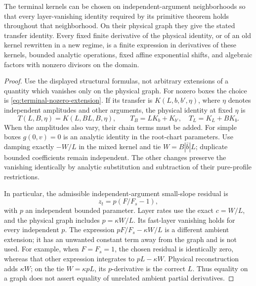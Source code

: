 \begin{lemma}
\label{lem:terminal-ambient-extension}
The terminal kernels can be chosen on independent-argument neighborhoods
so that every layer-vanishing identity required by its primitive theorem
holds throughout that neighborhood.  On their physical graph they give
the stated transfer identity.  Every fixed finite derivative of the
physical identity, or of an old kernel rewritten in a new regime, is a
finite expression in derivatives of these kernels, bounded analytic
operations, fixed affine exponential shifts, and algebraic factors with
nonzero divisors on the domain.
\end{lemma}
\begin{proof}
Use the displayed structural formulas, not arbitrary extensions of a
quantity which vanishes only on the physical graph.  For nozero boxes the
choice is \eqref{eq:terminal-nozero-extension}.  If its transfer is
\(K(L,b,b',\eta)\), where \(\eta\) denotes independent amplitudes and
other arguments, the physical identity at fixed \(\eta\) is
\[
 T(L,B,\eta)=K(L,BL,B,\eta),\qquad
 T_B=LK_b+K_{b'},\quad T_L=K_L+BK_b.
\]
When the amplitudes also vary, their chain terms must be added.
For simple boxes \(g(0,v)=0\) is an analytic identity in the root-chart
parameters.  Use damping exactly \(-W/L\) in the mixed kernel and tie
\(W=B|\bar b|L\); duplicate bounded coefficients remain independent.
The other changes preserve the vanishing identically by analytic
substitution and subtraction of their pure-profile restrictions.

In particular, the admissible independent-argument small-slope residual is
\begin{equation}\label{eq:terminal-structural-extension}
 z_t=p\left(F/F_s-1\right),
\end{equation}
with \(p\) an independent bounded parameter.  Layer rates use the exact
\(c=W/L\), and the physical graph includes \(p=\kappa W/L\).
Its fast-layer vanishing holds for every independent \(p\).
The expression \(pF/F_s-\kappa W/L\) is a different ambient extension;
it has an unwanted constant term away from the graph and is not used.
For example, when \(F=F_s=1\), the chosen residual is identically zero,
whereas that other expression integrates to \(pL-\kappa W\).
Physical reconstruction adds \(\kappa W\); on the tie
\(W=\kappa pL\), its \(p\)-derivative is the correct \(L\).
Thus equality on a graph does not assert equality of unrelated ambient
partial derivatives.


\end{proof}
